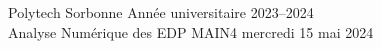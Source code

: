 \noindent
Polytech Sorbonne \hfill Ann{\'e}e universitaire 2023--2024\\
Analyse Numérique des EDP \hfill
MAIN4 \hfill mercredi 15 mai 2024